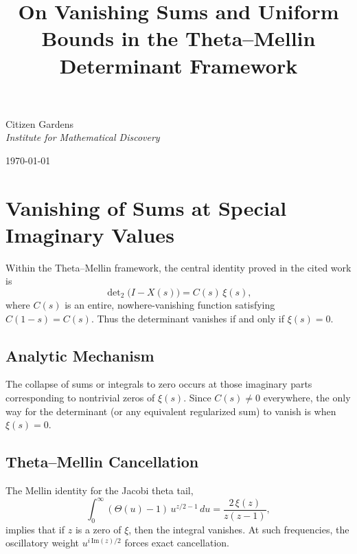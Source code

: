 \documentclass[12pt]{article}
\title{On Vanishing Sums and Uniform Bounds in the Theta--Mellin Determinant Framework}
\begin{document}
\maketitle
\begin{center}

\LARGE{Citizen Gardens} 
\vspace{0.5cm} \\
\textit{Institute for Mathematical Discovery} \\
\vspace{0.5cm}
{\normalsize \today \par}
\end{center}
\vspace{3cm}  
\section{Vanishing of Sums at Special Imaginary Values}

Within the Theta--Mellin framework, the central identity proved in the cited work is
\begin{equation}
\det\nolimits_{2}\big(I - X(s)\big) = C(s)\, \xi(s),
\end{equation}
where $C(s)$ is an entire, nowhere-vanishing function satisfying $C(1-s) = C(s)$. Thus the determinant vanishes if and only if $\xi(s)=0$.

\subsection{Analytic Mechanism}
The collapse of sums or integrals to zero occurs at those imaginary parts corresponding to nontrivial zeros of $\xi(s)$. Since $C(s)\neq 0$ everywhere, the only way for the determinant (or any equivalent regularized sum) to vanish is when $\xi(s)=0$.

\subsection{Theta--Mellin Cancellation}
The Mellin identity for the Jacobi theta tail,
\begin{equation}
\int_{0}^{\infty} (\Theta(u)-1) \, u^{z/2 - 1} \, du = \frac{2\, \xi(z)}{z(z-1)},
\end{equation}
implies that if $z$ is a zero of $\xi$, then the integral vanishes. At such frequencies, the oscillatory weight $u^{i\,\mathrm{Im}(z)/2}$ forces exact cancellation.
\end{document}
